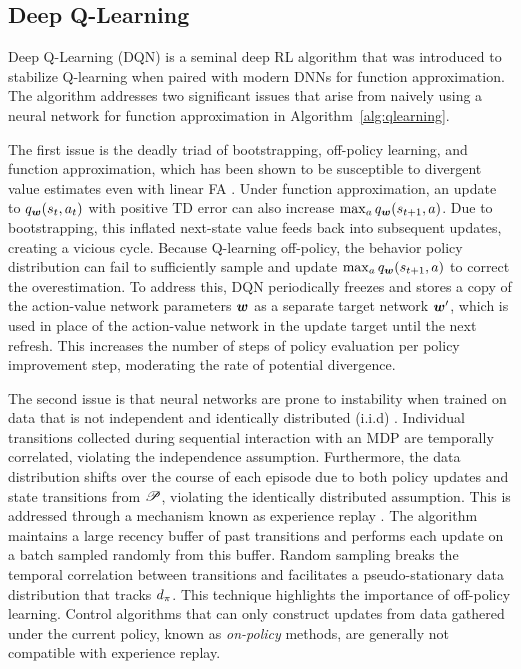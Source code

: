 \subsection{Deep Q-Learning} \label{subsec:dqn}
Deep Q-Learning (DQN)  is a seminal deep RL algorithm that was introduced to stabilize Q-learning when paired with modern DNNs for function approximation. The algorithm addresses two significant issues that arise from naively using a neural network for function approximation in Algorithm~\ref{alg:qlearning}. 

The first issue is the deadly triad \cite{sutton1998introduction} of bootstrapping, off-policy learning, and function approximation, which has been shown to be susceptible to divergent value estimates even with linear FA . Under function approximation, an update to $q_{\bm w}(s_t, a_t)$ with positive TD error can also increase $\max_a q_{\bm w}(s_{t+1}, a)$. Due to bootstrapping, this inflated next-state value feeds back into subsequent updates, creating a vicious cycle. Because Q-learning off-policy, the behavior policy distribution can fail to sufficiently sample and update $\max_a q_{\bm w}(s_{t+1}, a)$ to correct the overestimation. To address this, DQN periodically freezes and stores a copy of the action-value network parameters ${\bm w}$ as a separate target network ${\bm w}'$, which is used in place of the action-value network in the update target until the next refresh. This increases the number of steps of policy evaluation per policy improvement step, moderating the rate of potential divergence. 

The second issue is that neural networks are prone to instability when trained on data that is not independent and identically distributed (i.i.d) . Individual transitions collected during sequential interaction with an MDP are temporally correlated, violating the independence assumption. Furthermore, the data distribution shifts over the course of each episode due to both policy updates and state transitions from $\mathscr{P}$, violating the identically distributed assumption. This is addressed through a mechanism known as experience replay . The algorithm maintains a large recency buffer of past transitions and performs each update on a batch sampled randomly from this buffer. Random sampling breaks the temporal correlation between transitions and facilitates a pseudo-stationary data distribution that tracks $d_{\pi}$. This technique highlights the importance of off-policy learning. Control algorithms that can only construct updates from data gathered under the current policy, known as \textit{on-policy} methods, are generally not compatible with experience replay. 

